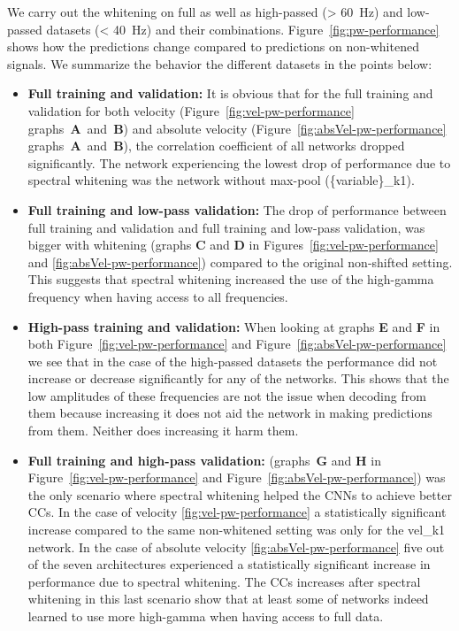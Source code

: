 We carry out the whitening on full as well as high-passed (> 60~Hz) and low-passed datasets (< 40~Hz) and their combinations. 
Figure~\ref{fig:pw-performance} shows how the predictions change compared to predictions on non-whitened signals.
We summarize the behavior the different datasets in the points below:
\begin{itemize}
    \item \textbf{Full training and validation:} It is obvious that for the full training and validation for both velocity (Figure~\ref{fig:vel-pw-performance} graphs~\textbf{A}~and~\textbf{B}) and absolute velocity (Figure~\ref{fig:absVel-pw-performance} graphs~\textbf{A}~and~\textbf{B}), the correlation coefficient of all networks dropped significantly. The network experiencing the lowest drop of performance due to spectral whitening was the network without max-pool (\{variable\}\_k1).

    \item \textbf{Full training and low-pass validation:} The drop of performance between full training and validation and full training and low-pass validation, was bigger with whitening (graphs \textbf{C} and \textbf{D} in Figures~\ref{fig:vel-pw-performance} and \ref{fig:absVel-pw-performance}) compared to the original non-shifted setting. This suggests that spectral whitening increased the use of the high-gamma frequency when having access to all frequencies.  
    
    \item \textbf{High-pass training and validation:} When looking at graphs \textbf{E} and \textbf{F} in both Figure~\ref{fig:vel-pw-performance} and Figure~\ref{fig:absVel-pw-performance} we see that in the case of the high-passed datasets the performance did not increase or decrease significantly for any of the networks. 
    This shows that the low amplitudes of these frequencies are not the issue when decoding from them because increasing it does not aid the network in making predictions from them. Neither does increasing it harm them.
    
    \item \textbf{Full training and high-pass validation:} (graphs~\textbf{G} and \textbf{H} in Figure~\ref{fig:vel-pw-performance} and Figure~\ref{fig:absVel-pw-performance})
    was the only scenario where spectral whitening helped the CNNs to achieve better CCs. 
    In the case of velocity \ref{fig:vel-pw-performance} a statistically significant increase compared to the same non-whitened setting was only for the vel\_k1 network.
    In the case of absolute velocity \ref{fig:absVel-pw-performance} five out of the seven architectures experienced a statistically significant increase in performance due to spectral whitening.
    The CCs increases after spectral whitening in this last scenario show that at least some of networks indeed learned to use more high-gamma when having access to full data.
\end{itemize}


